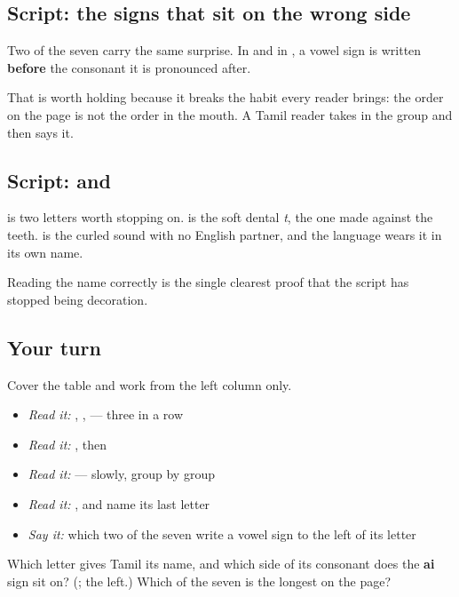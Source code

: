 \subsection*{Script: the signs that sit on the wrong side}
Two of the seven carry the same surprise. In \textbf{} and in \textbf{}, a vowel sign is written \textbf{before} the consonant it is pronounced after.

That is worth holding because it breaks the habit every reader brings: the order on the page is not the order in the mouth. A Tamil reader takes in the group and then says it.

\subsection*{Script:  and }
\textbf{} is two letters worth stopping on. \textbf{} is the soft dental \emph{t}, the one made against the teeth. \textbf{} is the curled sound with no English partner, and the language wears it in its own name.

Reading the name correctly is the single clearest proof that the script has stopped being decoration.

\subsection*{Your turn}
Cover the table and work from the left column only.

\begin{itemize}
\raggedright
  \item \emph{Read it:} \textbf{}, \textbf{}, \textbf{} — three in a row
  \item \emph{Read it:} \textbf{}, then \textbf{}
  \item \emph{Read it:} \textbf{} — slowly, group by group
  \item \emph{Read it:} \textbf{}, and name its last letter
  \item \emph{Say it:} which two of the seven write a vowel sign to the left of its letter
\end{itemize}

\begin{tcolorbox}[breakable,colback=teal!4,colframe=teal!35!black,title={Before you move on}]
Which letter gives Tamil its name, and which side of its consonant does the \textbf{ai} sign sit on? (\textbf{}; the left.) Which of the seven is the longest on the page?
\end{tcolorbox}

